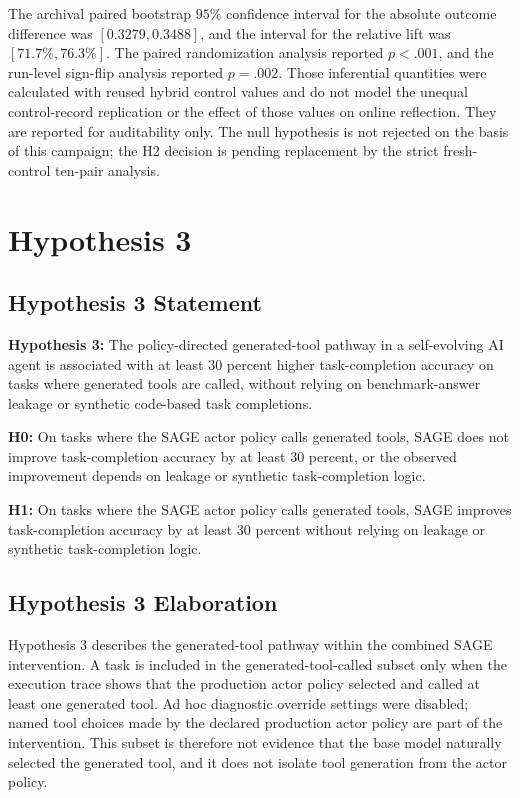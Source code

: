 The archival paired bootstrap $95\%$ confidence interval for the absolute outcome difference was $[0.3279, 0.3488]$, and the interval for the relative lift was $[71.7\%, 76.3\%]$. The paired randomization analysis reported $p < .001$, and the run-level sign-flip analysis reported $p = .002$. Those inferential quantities were calculated with reused hybrid control values and do not model the unequal control-record replication or the effect of those values on online reflection. They are reported for auditability only. The null hypothesis is not rejected on the basis of this campaign; the H2 decision is pending replacement by the strict fresh-control ten-pair analysis.

\section{Hypothesis 3}
\label{sec:chapter4-hypothesis3}

\subsection{Hypothesis 3 Statement}
\label{subsec:h3-statement}

\textbf{Hypothesis 3:} The policy-directed generated-tool pathway in a self-evolving AI agent is associated with at least 30 percent higher task-completion accuracy on tasks where generated tools are called, without relying on benchmark-answer leakage or synthetic code-based task completions.

\textbf{H0:} On tasks where the SAGE actor policy calls generated tools, SAGE does not improve task-completion accuracy by at least 30 percent, or the observed improvement depends on leakage or synthetic task-completion logic.

\textbf{H1:} On tasks where the SAGE actor policy calls generated tools, SAGE improves task-completion accuracy by at least 30 percent without relying on leakage or synthetic task-completion logic.

\subsection{Hypothesis 3 Elaboration}
\label{subsec:h3-elaboration}

Hypothesis 3 describes the generated-tool pathway within the combined SAGE intervention. A task is included in the generated-tool-called subset only when the execution trace shows that the production actor policy selected and called at least one generated tool. Ad hoc diagnostic override settings were disabled; named tool choices made by the declared production actor policy are part of the intervention. This subset is therefore not evidence that the base model naturally selected the generated tool, and it does not isolate tool generation from the actor policy.

